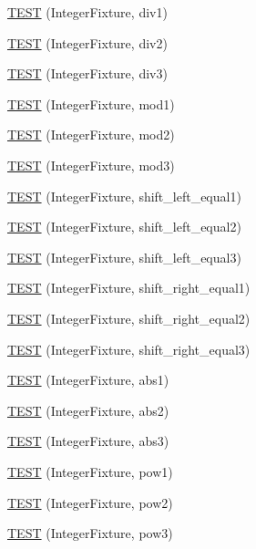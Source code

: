 \begin{DoxyCompactItemize}
\item 
\hyperlink{_old_test_integer_8c_09_09_adb0d928491fb9ea9cc626a106df71593}{T\-E\-S\-T} (Integer\-Fixture, div1)
\item 
\hyperlink{_old_test_integer_8c_09_09_ad51a92e11e604831df276045d3302c82}{T\-E\-S\-T} (Integer\-Fixture, div2)
\item 
\hyperlink{_old_test_integer_8c_09_09_a3d8823c1928745620c842c34fd753c9f}{T\-E\-S\-T} (Integer\-Fixture, div3)
\item 
\hyperlink{_old_test_integer_8c_09_09_a5a3e5e2da8ceac800cf98ccc31190fb3}{T\-E\-S\-T} (Integer\-Fixture, mod1)
\item 
\hyperlink{_old_test_integer_8c_09_09_af8da24ec2c1997a271cf2132d137fa5d}{T\-E\-S\-T} (Integer\-Fixture, mod2)
\item 
\hyperlink{_old_test_integer_8c_09_09_a2b100215b05edf640337b4808eef0447}{T\-E\-S\-T} (Integer\-Fixture, mod3)
\item 
\hyperlink{_old_test_integer_8c_09_09_ac61631f702c7ea22e5bd4fa98969e9ea}{T\-E\-S\-T} (Integer\-Fixture, shift\-\_\-left\-\_\-equal1)
\item 
\hyperlink{_old_test_integer_8c_09_09_a5fa62bd8086b90cd8f34c9b8c323f1e6}{T\-E\-S\-T} (Integer\-Fixture, shift\-\_\-left\-\_\-equal2)
\item 
\hyperlink{_old_test_integer_8c_09_09_a0ac3a659eb01bc27e764ec6832d53c62}{T\-E\-S\-T} (Integer\-Fixture, shift\-\_\-left\-\_\-equal3)
\item 
\hyperlink{_old_test_integer_8c_09_09_a37ed42e0089ee636a2c8ce9fa3b2f65f}{T\-E\-S\-T} (Integer\-Fixture, shift\-\_\-right\-\_\-equal1)
\item 
\hyperlink{_old_test_integer_8c_09_09_a1ce22a70294a53e2d85b7f113710d95e}{T\-E\-S\-T} (Integer\-Fixture, shift\-\_\-right\-\_\-equal2)
\item 
\hyperlink{_old_test_integer_8c_09_09_aa129a03b21d6e2c23e7bf3cf254edeff}{T\-E\-S\-T} (Integer\-Fixture, shift\-\_\-right\-\_\-equal3)
\item 
\hyperlink{_old_test_integer_8c_09_09_a17d2e19e3ee00f0ed7155677e1b154a6}{T\-E\-S\-T} (Integer\-Fixture, abs1)
\item 
\hyperlink{_old_test_integer_8c_09_09_a7504320f0b9dd100aec4822556a0598a}{T\-E\-S\-T} (Integer\-Fixture, abs2)
\item 
\hyperlink{_old_test_integer_8c_09_09_ae4016846ce98202c9b9bb37d2c139028}{T\-E\-S\-T} (Integer\-Fixture, abs3)
\item 
\hyperlink{_old_test_integer_8c_09_09_ac1f98278a1a88743082f3a97e5180a2e}{T\-E\-S\-T} (Integer\-Fixture, pow1)
\item 
\hyperlink{_old_test_integer_8c_09_09_ac2880cab72f5b9dd22bba9b7dc6c7c4b}{T\-E\-S\-T} (Integer\-Fixture, pow2)
\item 
\hyperlink{_old_test_integer_8c_09_09_a3bf1a95e5c364f3cf8dd3a2ebbf4a455}{T\-E\-S\-T} (Integer\-Fixture, pow3)
\end{DoxyCompactItemize}


